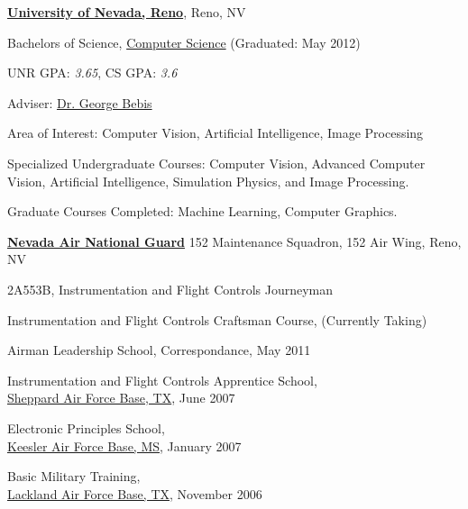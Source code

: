 \documentclass[10pt]{article}
\newenvironment{outerlist}[1][\enskip\textbullet]%
        {\begin{itemize}[#1]}{\end{itemize}%
         \vspace{-.6\baselineskip}}
\newenvironment{innerlist}[1][\enskip\textbullet]%
        {\begin{compactitem}[#1]}{\end{compactitem}}
\begin{document}
\href{http://www.unr.edu/}{\textbf{University of Nevada, Reno}},
Reno, NV 
\begin{outerlist}
\item[] Bachelors of Science, 
        \href{http://www.cse.unr.edu/}
             {Computer Science}
             (Graduated: May 2012)
        \begin{innerlist}
        \item UNR GPA: \emph{3.65}, CS GPA: \emph{3.6}
        \item Adviser:
              \href{http://www.cse.unr.edu/~bebis/}
                   {Dr. George Bebis}
        \item Area of Interest: Computer Vision, Artificial Intelligence, Image Processing
        \item Specialized Undergraduate Courses: Computer Vision, Advanced Computer Vision, 
              Artificial Intelligence, Simulation Physics, and Image Processing.
        \item Graduate Courses Completed: Machine Learning, Computer Graphics.\\
        \end{innerlist}
\end{outerlist}

\href{http://www.af.mil/}{\textbf{Nevada Air National Guard}}
152 Maintenance Squadron, 152 Air Wing, Reno, NV
\begin{outerlist}
\item[] 2A553B, {Instrumentation and Flight Controls Journeyman}
        \begin{innerlist}
        \item Instrumentation and Flight Controls Craftsman Course, (Currently Taking)
        \item Airman Leadership School, Correspondance, May 2011
        \item Instrumentation and Flight Controls Apprentice School,\\
        \href{http://www.sheppard.af.mil/}
             {Sheppard Air Force Base, TX}, June 2007
        \item Electronic Principles School,\\
        \href{http://www.keesler.af.mil/}
             {Keesler Air Force Base, MS}, January 2007
        \item Basic Military Training,\\
        \href{http://www.lackland.af.mil/}
             {Lackland Air Force Base, TX}, November 2006\\
        \end{innerlist}
\end{outerlist}
\end{document}
